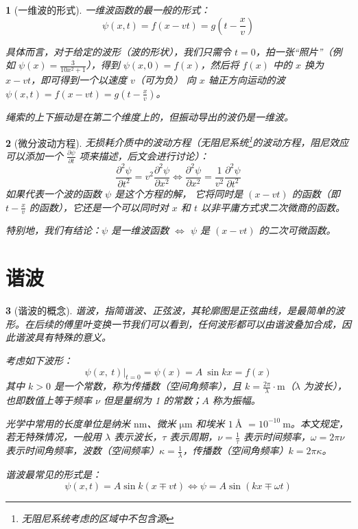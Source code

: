 \documentclass[UTF8]{report}
\theoremstyle{MyLineTheoremStyle} %
\theoremstyle{MyBlockTheoremStyle} %
\theoremstyle{MySubsubsectionStyle} %
\newtheorem{definition}{}
\begin{document}
\begin{definition}[一维波的形式]
一维波函数的最一般的形式：
\begin{equation}
\psi(x,t) = f(x-vt) = g(t - \frac{x}{v})
\end{equation}

具体而言，对于给定的波形（波的形状），我们只需令 $t=0$，拍一张“照片”（例如 $\psi(x) = \frac{3}{10x^2+1}$），得到 $\psi(x,0) = f(x)$，然后将 $f(x)$ 中的 $x$ 换为 $x-vt$，即可得到一个以速度 $v$（可为负） 向 $x$ 轴正方向运动的波 $\psi(x,t) = f(x - vt) = g(t - \frac{x}{v})$。
{\par\color{gray}\small
绳索的上下振动是在第二个维度上的，但振动导出的波仍是一维波。
\par}
\end{definition}


\begin{definition}[微分波动方程]
无损耗介质中的波动方程（无阻尼系统\footnote{无阻尼系统考虑的区域中不包含源}的波动方程，阻尼效应可以添加一个 $\frac{\partial \psi }{\partial t }$ 项来描述，后文会进行讨论）：
\begin{equation}
    \frac{\partial^{2}\psi}{\partial t^{2}}  = v^2\frac{\partial^{2}\psi}{\partial x^{2}}\Longleftrightarrow \frac{\partial^{2}\psi}{\partial x^{2}}=\frac{1}{v^{2}}\frac{\partial^{2}\psi}{\partial t^{2}} 
\end{equation}
如果代表一个波的函数 $\psi$ 是这个方程的解， 它将同时是 $(x-vt)$ 的函数（即 $t - \frac{x}{v}$ 的函数），它还是一个可以同时对 $x$ 和 $t$ 以非平庸方式求二次微商的函数。\par
特别地，我们有结论：$\psi$ 是一维波函数 $\Longleftrightarrow$ $\psi$ 是 $(x-vt)$ 的二次可微函数。
\end{definition}

\section{谐波}

\begin{definition}[谐波的概念]
谐波，指简谐波、正弦波，其轮廓图是正弦曲线，是最简单的波形。在后续的傅里叶变换一节我们可以看到，任何波形都可以由谐波叠加合成，因此谐波具有特殊的意义。

考虑如下波形：
\begin{equation}
    \psi(x,\:t)\big|_{t=0}=\psi(x)=A\:\sin kx=f(x)
\end{equation}
其中 $k>0$ 是一个常数，称为传播数（空间角频率），且 $k = \frac{2\pi}{\lambda} \cdot \mathrm{m}$（$\lambda$ 为波长），也即数值上等于频率 $\nu$ 但是量纲为 1 的常数；$A$ 称为振幅。\par
光学中常用的长度单位是纳米 $\mathrm{nm}$、微米 $\mathrm{\mu m}$ 和埃米 $1\ \si{\angstrom}$ $ = 10^{-10}\ \mathrm{m}$。本文规定，若无特殊情况，一般用 $\lambda$ 表示波长，$\tau $ 表示周期，$\nu = \frac{1}{\tau}$ 表示时间频率，$\omega = 2\pi\nu$ 表示时间角频率，波数（空间频率）$\kappa = \frac{1}{\lambda}$，传播数（空间角频率）$k = 2\pi \kappa$。

谐波最常见的形式是：
\begin{equation}
    \psi(x,t)=A\sin k(x\mp vt) \Longleftrightarrow \psi=A\sin(kx\mp\omega t)
\end{equation}
\end{definition}
\end{document}
